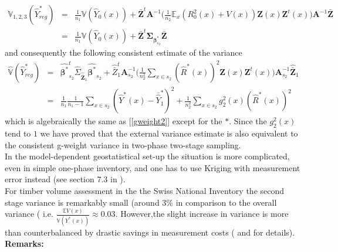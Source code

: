 \documentclass[a4paper,12pt,leqno, titlepage]{article}
\newcommand{\EX}{\mathbb{E}}
\newcommand{\VAR}{\mathbb{V}}
\begin{document}
 \begin{eqnarray}\label{vartwophasetwostageyreg1}
 \VAR_{1,2,3}(\hat{Y}^*_{reg})&=&\frac{1}{n_1}\VAR(\hat{Y}_0(x))+
  \bar{\pmb{Z}}^t\pmb{A}^{-1}\Big(
 \frac{1}{n_2}\EX_x( R_0^2(x)+V(x))\pmb{Z}(x)\pmb{Z}^t(x)\Big)\pmb{A}^{-1}\bar{\pmb{Z}} \nonumber \\
 &=&\frac{1}{n_1}\VAR(\hat{Y}_0(x))+\bar{\pmb{Z}}^t\pmb{\Sigma}_{\pmb{\beta}^*_{s_2}}\bar{\pmb{Z}}
  \end{eqnarray}
 and consequently the following consistent estimate of the variance
 \begin{eqnarray}\label{esttwophasetwostageasymptvar}
 \hat{\VAR}(\hat{Y}^*_{reg})&=&\hat{\pmb{\beta}^*}_{s_2}^t\hat{\Sigma}_{\hat{\bar{\pmb{Z}}}_{1}}\hat{\pmb{\beta}^*}_{s_2}
 +\hat{\bar{Z}}_1^t\pmb{A}_{s_2}^{-1}\big(\frac{1}{n^2_2}\sum_{x\in{s_2}}(\hat{R}^*(x))^2\pmb{Z}(x)\pmb{Z}^t(x)\big) \pmb{A}_{s_2}^{-1}\hat{\bar{\pmb{Z}}}_1 \nonumber \\
 &=&\frac{1}{n_1}\frac{1}{n_1-1}\sum_{x\in{s_2}}(\hat{Y}^*(x)-\bar{\hat{Y}}^*_1)^2 +
 \frac{1}{n^2_2}\sum_{x\in{s_2}}g^2_{2}(x)(\hat{R}^*(x))^2
 \end{eqnarray}
 which is algebraically the same as [\ref{gweight2}] except for the $*$. Since the $g^2_{2}(x)$ tend to $1$ we have proved that the external variance estimate is also equivalent to the consistent g-weight variance in two-phase two-stage sampling.\\
 In the model-dependent geostatistical set-up the situation is more complicated, even in simple one-phase inventory, and one has to use Kriging with measurement error instead (see section 7.3 in \cite{mandallaz}). \\
 For timber volume assessment in the the Swiss National Inventory the second stage variance is remarkably small (around $3\%$ in comparison to the overall variance ( i.e.
 $\frac{\EX V(x)}{\VAR(Y^*(x))}\approx 0.03$. However,the slight increase in variance is more than counterbalanced by drastic savings in measurement costs (\cite{mandallazmassey1} and \cite{massey} for details).\\
 \noindent
 \textbf{Remarks:}\label{remarkstwophase}
\end{document}
